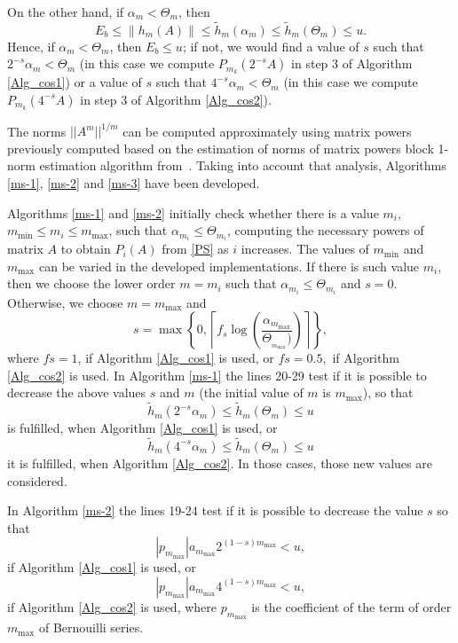 On the other hand, if $\alpha_m<\Theta_m$, then
\begin{equation}
{E_b} \leqslant \left\| {{h_m}(A)} \right\| \leqslant {\tilde h_m}(\alpha _m) \leqslant {\tilde h_m}({\Theta _m}) \leqslant u.
\end{equation}
Hence, if $\alpha_m<\Theta_m$, then $E_b\le u$; if not, we would find a value of $s$ such that $2^{-s}\alpha_m<\Theta_m$ (in this case we   compute $P_{m_k}(2^{-s}A)$ in step 3 of Algorithm \ref{Alg_cos1}) or a value of $s$ such that $4^{-s}\alpha_m<\Theta_m$ (in this case we  compute $P_{m_k}(4^{-s}A)$ in step 3 of Algorithm \ref{Alg_cos2}). 

The norms $||A^{m}||^{1/m}$ can be computed approximately using  matrix powers
previously computed  based on the estimation of norms of matrix powers  block 1-norm estimation algorithm
from~\cite{High88}. Taking  into account
that analysis, Algorithms \ref{ms-1}, \ref{ms-2} and \ref{ms-3}  have been developed.  

Algorithms \ref{ms-1} and \ref{ms-2} initially check whether there is a value $m_i$,  $m_{\min}\le m_{i}\le m_{\max}$,
such that $\alpha_{m_{i}} \leq \Theta_{m_{i}}$, computing the necessary powers of matrix $A$  to obtain $P_{i}(A)$ from \eqref{PS} as $i$ increases. The values  of  $m_{\min}$ and $ m_{\max}$ can be  varied in the developed implementations.
 If there is such value $m_i$, then we choose the lower
order $m=m_i$ such that $\alpha_{m_{i}} \leq \Theta_{m_{i}}$ and  $s=0$.
Otherwise, we choose $m=m_{\max}$ and
\begin{equation*}
s = \max \left\{ {0,\left\lceil f_{s}\log \left(
{\frac{{{\alpha_{m_{\max}}}}}{{\Theta_{_{m_{\max}}})}}} \right)
\right\rceil } \right\},
\end{equation*}%
where $fs=1$, if Algorithm \ref{Alg_cos1} is used, or  $fs=0.5,$ if Algorithm \ref{Alg_cos2} is used. In Algorithm \ref{ms-1} the lines 20-29 test if it is possible to decrease the above values $s$ and $m$ (the initial value of $m$ is $m_{\max}$), so that
\[{\tilde h_m}(2^{-s}\alpha _m) \leqslant {\tilde h_m}({\Theta _m}) \leqslant u \]
is fulfilled, when Algorithm \ref{Alg_cos1} is used, or \[{\tilde h_m}(4^{-s}\alpha _m) \leqslant {\tilde h_m}({\Theta _m}) \leqslant u\]
 it is fulfilled, when Algorithm \ref{Alg_cos2}.
In those cases, those new values are considered.

In Algorithm \ref{ms-2} the lines 19-24 test if it is possible to decrease the value $s$ so that
  $$|p_{m_{\max}}|a_{m_{\max}}2^{(1-s)m_{\max}}<u,$$
if Algorithm \ref{Alg_cos1} is used, or
$$|p_{m_{\max}}|a_{m_{\max}}4^{(1-s)m_{\max}}<u,$$
if Algorithm \ref{Alg_cos2} is used, where $p_{m_{\max}}$ is the  coefficient of the term of order $m_{\max}$ of Bernouilli series. 

